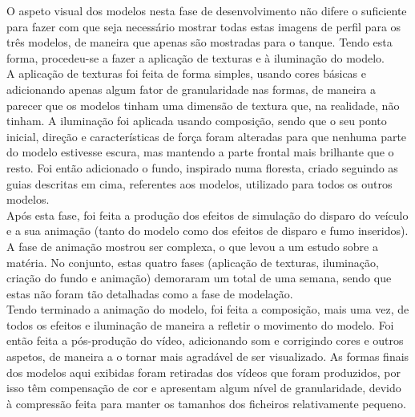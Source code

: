 O aspeto visual dos modelos nesta fase de desenvolvimento não difere o suficiente para fazer com que seja necessário mostrar todas estas imagens de perfil para os três modelos, de maneira que apenas são mostradas para o tanque.
Tendo esta forma, procedeu-se a fazer a aplicação de texturas e à iluminação do modelo. \\ 

A aplicação de texturas foi feita de forma simples, usando cores básicas e adicionando apenas algum fator de granularidade nas formas, de maneira a parecer que os modelos tinham uma dimensão de textura que, na realidade, não tinham.
A iluminação foi aplicada usando composição, sendo que o seu ponto inicial, direção e características de força foram alteradas para que nenhuma parte do modelo estivesse escura, mas mantendo a parte frontal mais brilhante que o resto.
Foi então adicionado o fundo, inspirado numa floresta, criado seguindo as guias descritas em cima, referentes aos modelos, utilizado para todos os outros modelos. \\ 

Após esta fase, foi feita a produção dos efeitos de simulação do disparo do veículo e a sua animação (tanto do modelo como dos efeitos de disparo e fumo inseridos). A fase de animação mostrou ser complexa, o que levou a um estudo sobre a matéria. No conjunto, estas quatro fases (aplicação de texturas, iluminação, criação do fundo e animação) demoraram um total de uma semana, sendo que estas não foram tão detalhadas como a fase de modelação. \\ 

Tendo terminado a animação do modelo, foi feita a composição, mais uma vez, de todos os efeitos e iluminação de maneira a refletir o movimento do modelo. Foi então feita a pós-produção do vídeo, adicionando som e corrigindo cores e outros aspetos, de maneira a o tornar mais agradável de ser visualizado. As formas finais dos modelos aqui exibidas foram retiradas dos vídeos que foram produzidos, por isso têm compensação de cor e apresentam algum nível de granularidade, devido à compressão feita para manter os tamanhos dos ficheiros relativamente pequeno.\\ 

